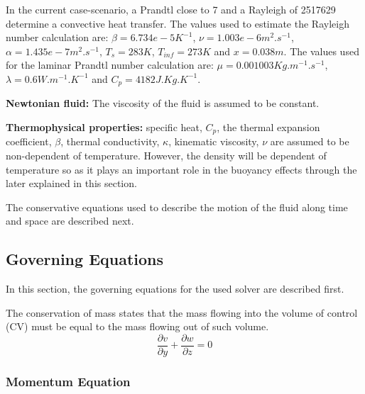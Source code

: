 \noindent In the current case-scenario, a Prandtl close to 7 and a Rayleigh of 2517629 determine a convective heat transfer. The values used to estimate the Rayleigh number calculation are: $\beta = 6.734e-5 K^{-1}$, $\nu = 1.003e-6 m^{2}.s^{-1}$, $\alpha = 1.435e-7 m^{2}.s^{-1}$, $T_{s} = 283 K$, $T_{inf} = 273 K$ and $x = 0.038 m$. The values used for the laminar Prandtl number calculation are: $\mu = 0.001003 Kg.m^{-1}.s^{-1}$, $\lambda = 0.6 W.m^{-1}.K^{-1}$ and $C_{p}=4182 J.Kg.K^{-1}$.

\textbf{Newtonian fluid:} The viscosity of the fluid is assumed to be constant.

\textbf{Thermophysical properties:} specific heat, \textit{$C_p$}, the thermal expansion coefficient, \textit{$\beta$}, thermal conductivity, \textit{$\kappa$}, kinematic viscosity, \textit{$\nu$} are assumed to be non-dependent of temperature. However, the density will be dependent of temperature so as it plays an important role in the buoyancy effects through the later explained in this section.

\noindent The conservative equations used to describe the motion of the fluid along time and space are described next.

\subsection{Governing Equations}

\setlength{\parindent}{0.5cm} In this section, the governing equations for the used solver are described first.

The conservation of mass states that the mass flowing into the volume of control (CV) must be equal to the mass flowing out of such volume. 
\begin{equation}
	\frac{\partial v}{\partial y}+\frac{\partial w}{\partial z}=0
	\label{3.5}
\end{equation}

\subsubsection{Momentum Equation}

